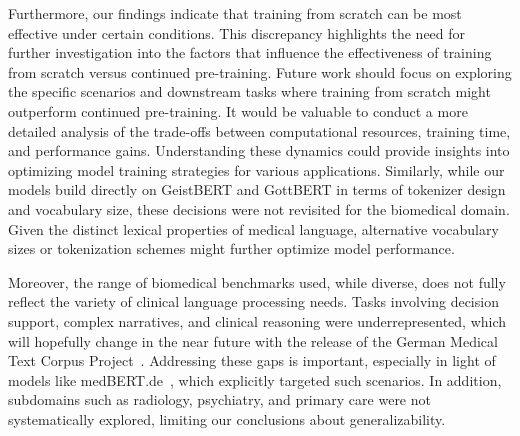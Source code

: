 Furthermore, our findings indicate that training from scratch can be most
effective under certain conditions. This discrepancy highlights the need for
further investigation into the factors that influence the effectiveness of
training from scratch versus continued pre-training. Future work should focus on
exploring the specific scenarios and downstream tasks where training from
scratch might outperform continued pre-training. It would be valuable to conduct
a more detailed analysis of the trade-offs between computational resources,
training time, and performance gains. Understanding these dynamics could provide
insights into optimizing model training strategies for various applications.
Similarly, while our models build directly on GeistBERT and GottBERT in terms of
tokenizer design and vocabulary size, these decisions were not revisited for the
biomedical domain. Given the distinct lexical properties of medical language,
alternative vocabulary sizes or tokenization schemes might further optimize
model performance.

Moreover, the range of biomedical benchmarks used, while diverse, does not fully
reflect the variety of clinical language processing needs. Tasks involving
decision support, complex narratives, and clinical reasoning were
underrepresented, which will hopefully change in the near future with the
release of the German Medical Text Corpus
Project~\cite{meineke2023announcement}. Addressing these gaps is important,
especially in light of models like medBERT.de~\cite{bressem2024medbert}, which
explicitly targeted such scenarios. In addition, subdomains such as radiology,
psychiatry, and primary care were not systematically explored, limiting our
conclusions about generalizability.

